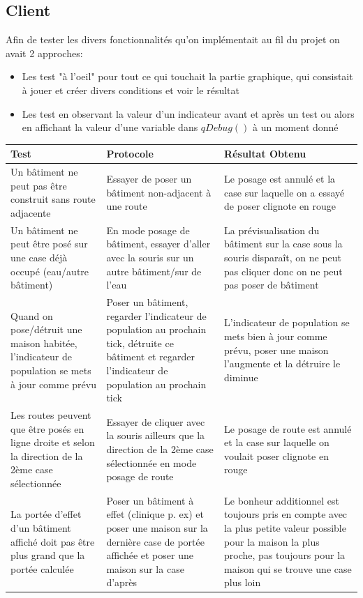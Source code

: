 \documentclass[a4paper,10pt,openany,oneside]{report}
\begin{document}
\subsection{Client}
Afin de tester les divers fonctionnalités qu'on implémentait au fil du projet on avait 2 approches:
\begin{itemize}
\item Les test "à l'oeil" pour tout ce qui touchait la partie graphique, qui consistait à jouer et créer divers conditions et voir le résultat
\
\item Les test en observant la  valeur d'un indicateur avant et après un test ou alors en affichant la valeur d'une variable dans $qDebug()$ à un moment donné

\end{itemize}
\begin{center}
	\begin{tabular}{| p{3cm} | p{6cm} | p{6cm} |}
	\hline
		 \textbf{Test} & \textbf{Protocole} & \textbf{Résultat Obtenu}
		 \\ \hline Un bâtiment ne peut pas être construit sans route adjacente & Essayer de poser un bâtiment non-adjacent à une route & Le posage est annulé et la case sur laquelle on a essayé de poser clignote en rouge
		\\ \hline Un bâtiment ne peut être posé sur une case déjà occupé (eau/autre bâtiment) & En mode posage de bâtiment, essayer d'aller avec la souris sur un autre bâtiment/sur de l'eau & La prévisualisation du bâtiment sur la case sous la souris disparaît, on ne peut pas cliquer donc on ne peut pas poser de bâtiment
		\\ \hline Quand on pose/détruit une maison habitée, l'indicateur de population se mets à jour comme prévu & Poser un bâtiment, regarder l'indicateur de population au prochain tick, détruite ce bâtiment et regarder l'indicateur de population au prochain tick & L'indicateur de population se mets bien à jour comme prévu, poser une maison l'augmente et la détruire le diminue
		\\ \hline Les routes peuvent que être posés en ligne droite et selon la direction de la 2ème case sélectionnée & Essayer de cliquer avec la souris ailleurs que la direction de la 2ème case sélectionnée en mode posage de route & Le posage de route est annulé et la case sur laquelle on voulait poser clignote en rouge
		\\ \hline La portée d'effet d'un bâtiment affiché doit pas être plus grand que la portée calculée & Poser un bâtiment à effet (clinique p. ex) et poser une maison sur la dernière case de portée affichée et poser une maison sur la case d'après & Le bonheur additionnel est toujours pris en compte avec la plus petite valeur possible pour la maison la plus proche, pas toujours pour la maison qui se trouve une case plus loin

\end{tabular}
\end{center}
\end{document}

